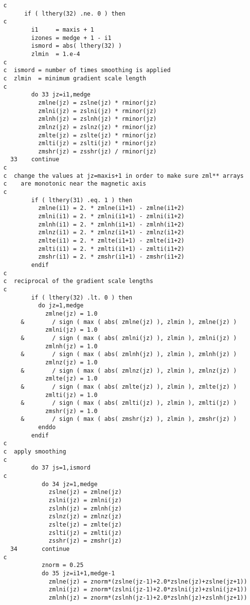 \begin{verbatim}
c
      if ( lthery(32) .ne. 0 ) then
c
        i1     = maxis + 1
        izones = medge + 1 - i1
        ismord = abs( lthery(32) )
        zlmin  = 1.e-4
c
c  ismord = number of times smoothing is applied
c  zlmin  = minimum gradient scale length
c
        do 33 jz=i1,medge
          zmlne(jz) = zslne(jz) * rminor(jz)
          zmlni(jz) = zslni(jz) * rminor(jz)
          zmlnh(jz) = zslnh(jz) * rminor(jz)
          zmlnz(jz) = zslnz(jz) * rminor(jz)
          zmlte(jz) = zslte(jz) * rminor(jz)
          zmlti(jz) = zslti(jz) * rminor(jz)
          zmshr(jz) = zsshr(jz) / rminor(jz)
  33    continue
c
c  change the values at jz=maxis+1 in order to make sure zml** arrays
c    are monotonic near the magnetic axis
c
        if ( lthery(31) .eq. 1 ) then
          zmlne(i1) = 2. * zmlne(i1+1) - zmlne(i1+2)
          zmlni(i1) = 2. * zmlni(i1+1) - zmlni(i1+2)
          zmlnh(i1) = 2. * zmlnh(i1+1) - zmlnh(i1+2)
          zmlnz(i1) = 2. * zmlnz(i1+1) - zmlnz(i1+2)
          zmlte(i1) = 2. * zmlte(i1+1) - zmlte(i1+2)
          zmlti(i1) = 2. * zmlti(i1+1) - zmlti(i1+2)
          zmshr(i1) = 2. * zmshr(i1+1) - zmshr(i1+2)
        endif
c
c  reciprocal of the gradient scale lengths
c
        if ( lthery(32) .lt. 0 ) then
          do jz=1,medge
            zmlne(jz) = 1.0 
     &        / sign ( max ( abs( zmlne(jz) ), zlmin ), zmlne(jz) )
            zmlni(jz) = 1.0 
     &        / sign ( max ( abs( zmlni(jz) ), zlmin ), zmlni(jz) )
            zmlnh(jz) = 1.0 
     &        / sign ( max ( abs( zmlnh(jz) ), zlmin ), zmlnh(jz) )
            zmlnz(jz) = 1.0 
     &        / sign ( max ( abs( zmlnz(jz) ), zlmin ), zmlnz(jz) )
            zmlte(jz) = 1.0 
     &        / sign ( max ( abs( zmlte(jz) ), zlmin ), zmlte(jz) )
            zmlti(jz) = 1.0 
     &        / sign ( max ( abs( zmlti(jz) ), zlmin ), zmlti(jz) )
            zmshr(jz) = 1.0 
     &        / sign ( max ( abs( zmshr(jz) ), zlmin ), zmshr(jz) )
          enddo
        endif
c
c  apply smoothing
c
        do 37 js=1,ismord
c
           do 34 jz=1,medge
             zslne(jz) = zmlne(jz)
             zslni(jz) = zmlni(jz)
             zslnh(jz) = zmlnh(jz)
             zslnz(jz) = zmlnz(jz)
             zslte(jz) = zmlte(jz)
             zslti(jz) = zmlti(jz)
             zsshr(jz) = zmshr(jz)
  34       continue
c
           znorm = 0.25
           do 35 jz=i1+1,medge-1
             zmlne(jz) = znorm*(zslne(jz-1)+2.0*zslne(jz)+zslne(jz+1))
             zmlni(jz) = znorm*(zslni(jz-1)+2.0*zslni(jz)+zslni(jz+1))
             zmlnh(jz) = znorm*(zslnh(jz-1)+2.0*zslnh(jz)+zslnh(jz+1))

\end{verbatim}
